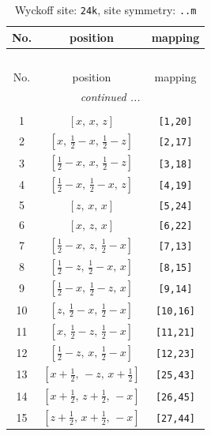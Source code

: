 \documentclass[fleqn,8pt]{jsarticle}
\begin{document}
\begin{longtable}{ccc}
\caption{Wyckoff site: {\tt 24k}, site symmetry: {\tt ..m}}
 \\
 \hline \hline
No. & position & mapping \\ \hline \endfirsthead

\multicolumn{2}{l}{\tablename\ \thetable{}} \\
 \hline \hline
No. & position & mapping \\ \hline \endhead

 \hline \hline
\multicolumn{2}{r}{\footnotesize\it continued ...} \\ \endfoot

 \hline \hline
\multicolumn{2}{r}{} \\ \endlastfoot

1 & $\left[ x,\, x,\, z \right]$ & {\tt [1,20]} \\ \hline
2 & $\left[ x,\, \frac{1}{2} - x,\, \frac{1}{2} - z \right]$ & {\tt [2,17]} \\ \hline
3 & $\left[ \frac{1}{2} - x,\, x,\, \frac{1}{2} - z \right]$ & {\tt [3,18]} \\ \hline
4 & $\left[ \frac{1}{2} - x,\, \frac{1}{2} - x,\, z \right]$ & {\tt [4,19]} \\ \hline
5 & $\left[ z,\, x,\, x \right]$ & {\tt [5,24]} \\ \hline
6 & $\left[ x,\, z,\, x \right]$ & {\tt [6,22]} \\ \hline
7 & $\left[ \frac{1}{2} - x,\, z,\, \frac{1}{2} - x \right]$ & {\tt [7,13]} \\ \hline
8 & $\left[ \frac{1}{2} - z,\, \frac{1}{2} - x,\, x \right]$ & {\tt [8,15]} \\ \hline
9 & $\left[ \frac{1}{2} - x,\, \frac{1}{2} - z,\, x \right]$ & {\tt [9,14]} \\ \hline
10 & $\left[ z,\, \frac{1}{2} - x,\, \frac{1}{2} - x \right]$ & {\tt [10,16]} \\ \hline
11 & $\left[ x,\, \frac{1}{2} - z,\, \frac{1}{2} - x \right]$ & {\tt [11,21]} \\ \hline
12 & $\left[ \frac{1}{2} - z,\, x,\, \frac{1}{2} - x \right]$ & {\tt [12,23]} \\ \hline
13 & $\left[ x + \frac{1}{2},\, - z,\, x + \frac{1}{2} \right]$ & {\tt [25,43]} \\ \hline
14 & $\left[ x + \frac{1}{2},\, z + \frac{1}{2},\, - x \right]$ & {\tt [26,45]} \\ \hline
15 & $\left[ z + \frac{1}{2},\, x + \frac{1}{2},\, - x \right]$ & {\tt [27,44]} \\ \hline

\end{longtable}
\end{document}
